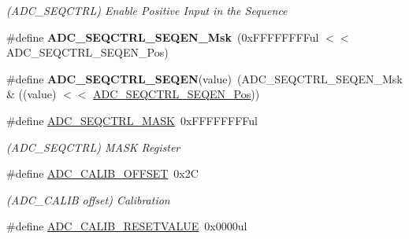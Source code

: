 \begin{DoxyCompactItemize}
\begin{DoxyCompactList}\small\item\em (A\+D\+C\+\_\+\+S\+E\+Q\+C\+T\+R\+L) Enable Positive Input in the Sequence \end{DoxyCompactList}\item 
\hypertarget{group___s_a_m_l21___a_d_c_ga879feeddf9afcf20c05c612e4e1c9f09}{}\#define {\bfseries A\+D\+C\+\_\+\+S\+E\+Q\+C\+T\+R\+L\+\_\+\+S\+E\+Q\+E\+N\+\_\+\+Msk}~(0x\+F\+F\+F\+F\+F\+F\+F\+Ful $<$$<$ A\+D\+C\+\_\+\+S\+E\+Q\+C\+T\+R\+L\+\_\+\+S\+E\+Q\+E\+N\+\_\+\+Pos)\label{group___s_a_m_l21___a_d_c_ga879feeddf9afcf20c05c612e4e1c9f09}

\item 
\hypertarget{group___s_a_m_l21___a_d_c_gae836fa961220a1ac7a0efb60d9af0306}{}\#define {\bfseries A\+D\+C\+\_\+\+S\+E\+Q\+C\+T\+R\+L\+\_\+\+S\+E\+Q\+E\+N}(value)~(A\+D\+C\+\_\+\+S\+E\+Q\+C\+T\+R\+L\+\_\+\+S\+E\+Q\+E\+N\+\_\+\+Msk \& ((value) $<$$<$ \hyperlink{group___s_a_m_l21___a_d_c_ga90766a8cbd7466974d345edb2f668b74}{A\+D\+C\+\_\+\+S\+E\+Q\+C\+T\+R\+L\+\_\+\+S\+E\+Q\+E\+N\+\_\+\+Pos}))\label{group___s_a_m_l21___a_d_c_gae836fa961220a1ac7a0efb60d9af0306}

\item 
\hypertarget{group___s_a_m_l21___a_d_c_ga79fe3cbb3e52e2a1d4f770324cd1108b}{}\#define \hyperlink{group___s_a_m_l21___a_d_c_ga79fe3cbb3e52e2a1d4f770324cd1108b}{A\+D\+C\+\_\+\+S\+E\+Q\+C\+T\+R\+L\+\_\+\+M\+A\+S\+K}~0x\+F\+F\+F\+F\+F\+F\+F\+Ful\label{group___s_a_m_l21___a_d_c_ga79fe3cbb3e52e2a1d4f770324cd1108b}

\begin{DoxyCompactList}\small\item\em (A\+D\+C\+\_\+\+S\+E\+Q\+C\+T\+R\+L) M\+A\+S\+K Register \end{DoxyCompactList}\item 
\hypertarget{group___s_a_m_l21___a_d_c_ga446711ba379074fa1f2f5c844b4d1b09}{}\#define \hyperlink{group___s_a_m_l21___a_d_c_ga446711ba379074fa1f2f5c844b4d1b09}{A\+D\+C\+\_\+\+C\+A\+L\+I\+B\+\_\+\+O\+F\+F\+S\+E\+T}~0x2\+C\label{group___s_a_m_l21___a_d_c_ga446711ba379074fa1f2f5c844b4d1b09}

\begin{DoxyCompactList}\small\item\em (A\+D\+C\+\_\+\+C\+A\+L\+I\+B offset) Calibration \end{DoxyCompactList}\item 
\hypertarget{group___s_a_m_l21___a_d_c_ga67180783b7377e1164e72a05423df707}{}\#define \hyperlink{group___s_a_m_l21___a_d_c_ga67180783b7377e1164e72a05423df707}{A\+D\+C\+\_\+\+C\+A\+L\+I\+B\+\_\+\+R\+E\+S\+E\+T\+V\+A\+L\+U\+E}~0x0000ul\label{group___s_a_m_l21___a_d_c_ga67180783b7377e1164e72a05423df707}


\end{DoxyCompactItemize}
